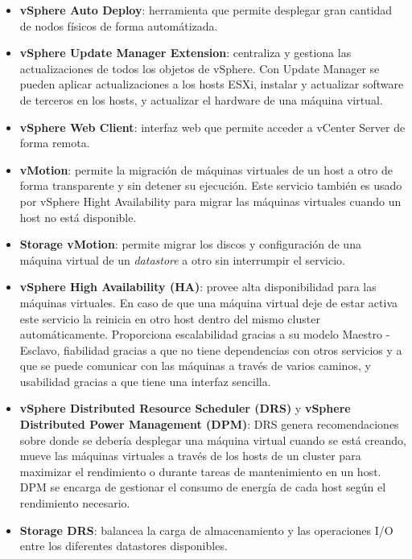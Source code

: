 \begin{itemize}
    

    \item \textbf{vSphere Auto Deploy}: herramienta que permite desplegar gran cantidad de nodos físicos de forma automátizada.
    
    \item \textbf{vSphere Update Manager Extension}: centraliza y gestiona las actualizaciones de todos los objetos de vSphere. Con Update Manager se pueden aplicar actualizaciones a los hosts ESXi, instalar y actualizar software de terceros en los hosts, y actualizar el hardware de una máquina virtual.
   
    \item \textbf{vSphere Web Client}: interfaz web que permite acceder a vCenter Server de forma remota.
    
    \item \textbf{vMotion}: permite la migración de máquinas virtuales de un host a otro de forma transparente y sin detener su ejecución. Este servicio también es usado por vSphere Hight Availability para migrar las máquinas virtuales cuando un host no está disponible.
    
    \item \textbf{Storage vMotion}: permite migrar los discos y configuración de una máquina virtual de un \textit{datastore} a otro sin interrumpir el servicio.
    
    \item \textbf{vSphere High Availability (HA)}: provee alta disponibilidad para las máquinas virtuales. En caso de que una máquina virtual deje de estar activa este servicio la reinicia en otro host dentro del mismo cluster automáticamente. Proporciona escalabilidad gracias a su modelo Maestro - Esclavo, fiabilidad gracias a que no tiene dependencias con otros servicios y a que se puede comunicar con las máquinas a través de varios caminos, y usabilidad gracias a que tiene una interfaz sencilla.
    
    \item \textbf{vSphere Distributed Resource Scheduler (DRS)} y \textbf{vSphere Distributed Power Management (DPM)}: DRS genera recomendaciones sobre donde se debería desplegar una máquina virtual cuando se está creando, mueve las máquinas virtuales a través de los hosts de un cluster para maximizar el rendimiento o durante tareas de mantenimiento en un host. DPM se encarga de gestionar el consumo de energía de cada host según el rendimiento necesario.
    \item \textbf{Storage DRS}: balancea la carga de almacenamiento y las operaciones I/O entre los diferentes datastores disponibles.
    

\end{itemize}
